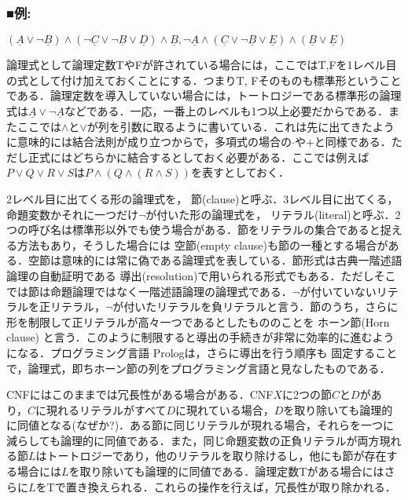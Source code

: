 \documentclass{ltjsarticle}
\theoremstyle{mystyle1}
\theoremstyle{mystyle2}
\newcommand{\uA}{\underline{A}}
\newcommand{\uB}{\underline{B}}
\newcommand{\uC}{\underline{C}}
\newcommand{\uD}{\underline{D}}
\newcommand{\uE}{\underline{E}}
\newcommand{\red}[1]{{\color{red} #1}}
\begin{document}
\subsubsection*{■例:}
$(\uA\vee\neg\uB)\wedge(\neg\uC\vee\neg\uB\vee\uD)\wedge\uB,\neg\uA\wedge(\uC\vee\neg\uB\vee\uE)\wedge(\uB\vee\uE)$

論理式として論理定数TやFが許されている場合には，ここではT,Fを1レベル目の式として付け加えておくことにする．つまりT, Fそのものも標準形ということである．論理定数を導入していない場合には，トートロジーである標準形の論理式は$\uA\vee\neg\uA$などである．一応，一番上のレベルも1つ以上必要だからである．またここでは$\wedge$と$\vee$が列を引数に取るように書いている．これは先に出てきたように意味的には結合法則が成り立つからで，多項式の場合の$\cdot$や$+$と同様である．ただし正式にはどちらかに結合するとしておく必要がある．ここでは例えば$P\vee Q\vee R\vee S$は$P\wedge(Q\wedge(R\wedge S))$を表すとしておく．

2レベル目に出てくる形の論理式を，\red{節}(clause)と呼ぶ．3レベル目に出てくる，命題変数かそれに一つだけ$\neg$が付いた形の論理式を，\red{リテラル}(literal)と呼ぶ．2つの呼び名は標準形以外でも使う場合がある．節をリテラルの集合であると捉える方法もあり，そうした場合には\red{空節}(empty clause)も節の一種とする場合がある．空節は意味的には常に偽である論理式を表している．節形式は古典一階述語論理の自動証明である\red{導出}(resolution)で用いられる形式でもある．ただしそこでは節は命題論理ではなく一階述語論理の論理式である．$\neg$が付いていないリテラルを正リテラル，$\neg$が付いたリテラルを負リテラルと言う．節のうち，さらに形を制限して正リテラルが高々一つであるとしたもののことを\red{ホーン節}(Horn clause) と言う．このように制限すると導出の手続きが非常に効率的に進むようになる．プログラミング言語\red{Prolog}は，さらに導出を行う順序も 固定することで，論理式，即ちホーン節の列をプログラミング言語と見なしたものである．

CNFにはこのままでは冗長性がある場合がある．CNF$X$に2つの節$C$と$D$があり，$C$に現れるリテラルがすべて$D$に現れている場合，$D$を取り除いても論理的に同値となる(なぜか?)．ある節に同じリテラルが現れる場合，それらを一つに減らしても論理的に同値である．また，同じ命題変数の正負リテラルが両方現れる節$L$はトートロジーであり，他のリテラルを取り除けるし，他にも節が存在する場合には$L$を取り除いても論理的に同値である．論理定数Tがある場合にはさらに$L$をTで置き換えられる．これらの操作を行えば，冗長性が取り除かれる．
\end{document}
